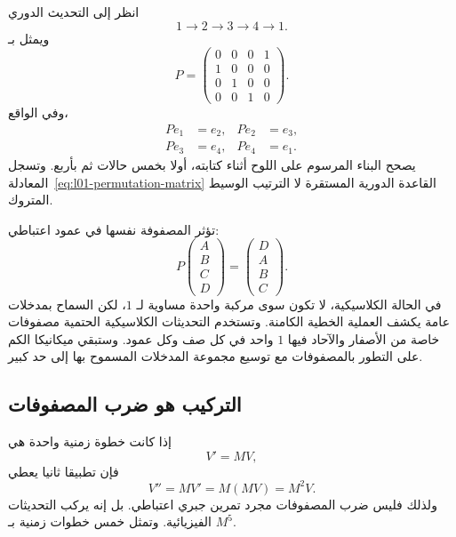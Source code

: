 انظر إلى التحديث الدوري
\begin{equation}
  1\longrightarrow2\longrightarrow3\longrightarrow4\longrightarrow1.
  \label{eq:l01-four-cycle}
\end{equation}
ويمثل بـ
\begin{equation}
  P=
  \begin{pmatrix}
    0&0&0&1\\
    1&0&0&0\\
    0&1&0&0\\
    0&0&1&0
  \end{pmatrix}.
  \label{eq:l01-permutation-matrix}
\end{equation}
وفي الواقع،
\begin{equation}
  \begin{aligned}
    Pe_1&=e_2, & Pe_2&=e_3,\\
    Pe_3&=e_4, & Pe_4&=e_1.
  \end{aligned}
\end{equation}
يصحح البناء المرسوم على اللوح أثناء كتابته، أولا بخمس حالات ثم بأربع. وتسجل المعادلة~\eqref{eq:l01-permutation-matrix} القاعدة الدورية المستقرة لا الترتيب الوسيط المتروك.

تؤثر المصفوفة نفسها في عمود اعتباطي:
\begin{equation}
  P
  \begin{pmatrix}A\\B\\C\\D\end{pmatrix}
  =
  \begin{pmatrix}D\\A\\B\\C\end{pmatrix}.
  \label{eq:l01-cyclic-shift}
\end{equation}
في الحالة الكلاسيكية، لا تكون سوى مركبة واحدة مساوية لـ \(1\)، لكن السماح بمدخلات عامة يكشف العملية الخطية الكامنة. وتستخدم التحديثات الكلاسيكية الحتمية مصفوفات خاصة من الأصفار والآحاد فيها \(1\) واحد في كل صف وكل عمود. وستبقي ميكانيكا الكم على التطور بالمصفوفات مع توسيع مجموعة المدخلات المسموح بها إلى حد كبير.

\subsection{التركيب هو ضرب المصفوفات}

إذا كانت خطوة زمنية واحدة هي
\begin{equation}
  V'=MV,
\end{equation}
فإن تطبيقا ثانيا يعطي
\begin{equation}
  V''=MV'=M(MV)=M^2V.
  \label{eq:l01-two-updates}
\end{equation}
ولذلك فليس ضرب المصفوفات مجرد تمرين جبري اعتباطي. بل إنه يركب التحديثات الفيزيائية. وتمثل خمس خطوات زمنية بـ \(M^5\).

